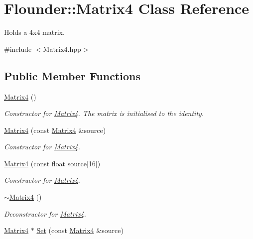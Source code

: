 \hypertarget{class_flounder_1_1_matrix4}{}\section{Flounder\+:\+:Matrix4 Class Reference}
\label{class_flounder_1_1_matrix4}


Holds a 4x4 matrix.  




{\ttfamily \#include $<$Matrix4.\+hpp$>$}

\subsection*{Public Member Functions}
\begin{DoxyCompactItemize}
\item 
\hyperlink{class_flounder_1_1_matrix4_a56d1593797ad27dde35926e240c55832}{Matrix4} ()
\begin{DoxyCompactList}\small\item\em Constructor for \hyperlink{class_flounder_1_1_matrix4}{Matrix4}. The matrix is initialised to the identity. \end{DoxyCompactList}\item 
\hyperlink{class_flounder_1_1_matrix4_af335508bd418a2a13059a0b95b3f486f}{Matrix4} (const \hyperlink{class_flounder_1_1_matrix4}{Matrix4} \&source)
\begin{DoxyCompactList}\small\item\em Constructor for \hyperlink{class_flounder_1_1_matrix4}{Matrix4}. \end{DoxyCompactList}\item 
\hyperlink{class_flounder_1_1_matrix4_ae26b549171fee7ae0c76c4f51744f95b}{Matrix4} (const float source\mbox{[}16\mbox{]})
\begin{DoxyCompactList}\small\item\em Constructor for \hyperlink{class_flounder_1_1_matrix4}{Matrix4}. \end{DoxyCompactList}\item 
\hyperlink{class_flounder_1_1_matrix4_ad070890e22fca24ef9ae7bf38165b1aa}{$\sim$\+Matrix4} ()
\begin{DoxyCompactList}\small\item\em Deconstructor for \hyperlink{class_flounder_1_1_matrix4}{Matrix4}. \end{DoxyCompactList}\item 
\hyperlink{class_flounder_1_1_matrix4}{Matrix4} $\ast$ \hyperlink{class_flounder_1_1_matrix4_a1c7cb94c6bf3cd8b221eea65bb1e818d}{Set} (const \hyperlink{class_flounder_1_1_matrix4}{Matrix4} \&source)

\end{DoxyCompactItemize}
